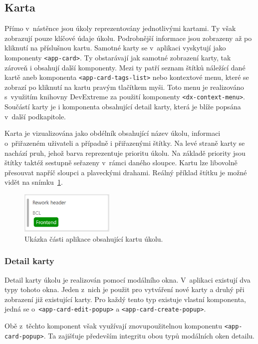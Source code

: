 \subsection{Karta}
Přímo v~nástěnce jsou úkoly reprezentovány jednotlivými kartami. Ty však zobrazují pouze klíčové údaje úkolu. Podrobnější informace jsou zobrazeny až po kliknutí na příslušnou kartu. Samotné karty se v~aplikaci vyskytují jako komponenty \texttt{<app-card>}. Ty obstarávají jak samotné zobrazení karty, tak zároveň i obsahují další komponenty. Mezi ty patří seznam štítků náležící dané kartě aneb komponenta \texttt{<app-card-tags-list>} nebo kontextové menu, které se zobrazí po kliknutí na kartu pravým tlačítkem myši. Toto menu je realizováno s~využitím knihovny DevExtreme za použití komponenty \texttt{<dx-context-menu>}. Součástí karty je i komponenta obsahující detail karty, která je blíže popsána v~další podkapitole.

Karta je vizualizována jako obdélník obsahující název úkolu, informaci o~přiřazeném uživateli a případně i přiřazenými štítky. Na levé straně karty se nachází pruh, jehož barva reprezentuje prioritu úkolu. Na základě priority jsou štítky taktéž sestupně seřazeny v~rámci daného sloupce. Kartu lze libovolně přesouvat napříč sloupci a plaveckými drahami. Reálný příklad štítku je možné vidět na snímku~\ref{img:card}.

\begin{figure}[H]
	\centering
	\label{img:card}
	\includegraphics[width=0.4\textwidth]{obrazky-figures/card.png}
	\caption{Ukázka části aplikace obsahující kartu úkolu.}
\end{figure}

\subsubsection*{Detail karty}
Detail karty úkolu je realizován pomocí modálního okna. V~aplikaci existují dva typy tohoto okna. Jeden z~nich je použit pro vytváření nové karty a druhý při zobrazení již existující karty. Pro každý tento typ existuje vlastní komponenta, jedná se o~\texttt{<app-card-edit-popup>} a \texttt{<app-card-create-popup>}.

Obě z~těchto komponent však využívají znovupoužitelnou komponentu \texttt{<app-card-popup>}. Ta zajišťuje především integritu obou typů modálních oken detailu.


